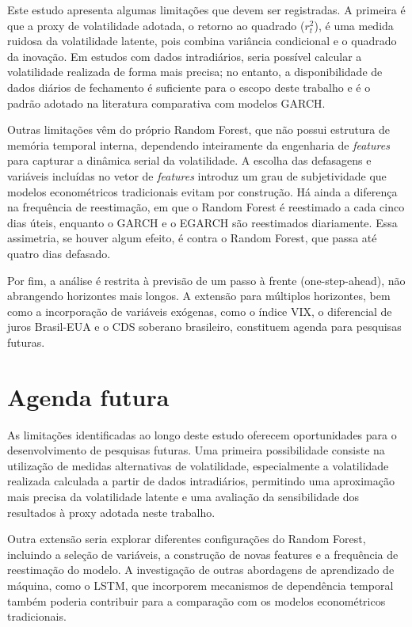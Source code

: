 Este estudo apresenta algumas limitações que devem ser registradas. A primeira é que a proxy de volatilidade adotada, o retorno ao quadrado ($r_t^2$), é uma medida ruidosa da volatilidade latente, pois combina variância condicional e o quadrado da inovação. Em estudos com dados intradiários, 
seria possível calcular a volatilidade realizada de forma mais precisa; no entanto, a disponibilidade de dados diários de fechamento é suficiente para o escopo deste trabalho e é o padrão adotado na literatura comparativa com modelos GARCH.

Outras limitações vêm do próprio Random Forest, que não possui estrutura de memória temporal interna, dependendo inteiramente da engenharia de \textit{features} para capturar a dinâmica serial da volatilidade. A escolha das defasagens e variáveis incluídas no vetor de \textit{features} introduz um grau de subjetividade 
que modelos econométricos tradicionais evitam por construção. Há ainda a diferença na frequência de reestimação, em que o Random Forest é reestimado a cada cinco dias úteis, enquanto o GARCH e o EGARCH são reestimados diariamente. Essa assimetria, se houver algum efeito, é contra o Random Forest, que passa até quatro dias defasado.

Por fim, a análise é restrita à previsão de um passo à frente (one-step-ahead), não abrangendo horizontes mais longos. A extensão para múltiplos horizontes, bem como a incorporação de variáveis exógenas, como o índice VIX, o diferencial de juros Brasil-EUA e o CDS soberano brasileiro, constituem agenda para pesquisas futuras.


\section{Agenda futura}

As limitações identificadas ao longo deste estudo oferecem oportunidades para o desenvolvimento de pesquisas futuras. Uma primeira 
possibilidade consiste na utilização de medidas alternativas de volatilidade, especialmente a volatilidade realizada calculada a 
partir de dados intradiários, permitindo uma aproximação mais precisa da volatilidade latente e uma avaliação da sensibilidade dos 
resultados à proxy adotada neste trabalho.

Outra extensão seria explorar diferentes configurações do Random Forest, incluindo a seleção de variáveis, a construção de novas 
features e a frequência de reestimação do modelo. A investigação de outras abordagens de aprendizado de máquina, como o LSTM, 
que incorporem mecanismos de dependência temporal também poderia contribuir para a comparação com os modelos econométricos tradicionais.


